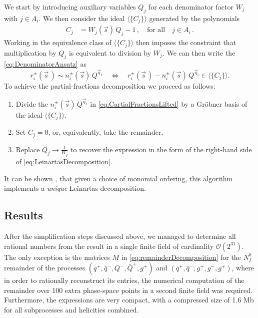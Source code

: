 We start by introducing auxiliary variables $Q_j$ for each
denominator factor $W_j$ with $j\in A_{i}$.
We then consider the ideal $\langle \{C_j\} \rangle $ generated by the polynomials
\begin{align} \label{eq:PartialFractionConstraints}
    C_j &= W_j (\vec s) \, Q_j - 1\,, \quad\mbox{for all}\quad  j \in  A_{i}\,.
\end{align}
Working in the equivalence class of $\langle \{C_j\} \rangle $ then imposes 
the constraint that multiplication by $Q_j$ is equivalent to division by $W_j$. 
We can then write the \cref{eq:DenominatorAnsatz} as
\begin{equation} \label{eq:CartialFractionsLifted}
    r_i^{\pm}(\vec{s}\,) \sim n_i^{\pm}(\vec s)\, Q^{\vec q_{i}} \quad\Leftrightarrow\quad r_i^{\pm}(\vec{s}\,) -  n_i^{\pm}(\vec s)\, Q^{\vec q_{i}} \in \langle \{C_j\} \rangle.
\end{equation}
To achieve the partial-fractions decomposition  we proceed as follows:
\begin{enumerate}
  \item Divide the $n_i^{\pm}(\vec s)\, Q^{\vec q_{i}}$ in \cref{eq:CartialFractionsLifted} by a Gröbner basis of the ideal $\langle \{C_j\} \rangle $.
  \item Set $C_j=0$, or, equivalently, take the remainder.
  \item Replace $Q_j\to \frac{1}{W_j}$ to recover the expression in the form of the right-hand side of \cref{eq:LeinartasDecomposition}.
\end{enumerate}
It can be shown \cite{raichev2012leinartas,Abreu:2019odu}, that given a choice of monomial ordering, this algorithm
implements a \emph{unique} Leǐnartas decomposition.

\subsection{Results}

After the simplification steps discussed above, 
we managed to determine all rational numbers from 
the result in a single finite field of cardinality $\mathcal{O}(2^{31})$.
The only exception is the matrices $M$ in \cref{eq:remainderDecomposition} for the $N_f^0$ remainder of the processes
$( q^+, {\bar q}^-,Q^-, {\bar Q}^+, g^+ )$ and $( q^+, {\bar q}^-,g^+, g^-, g^+ )$,  where
in order to rationally reconstruct its
entries, the numerical computation of the remainder over 100 extra phase-space 
points in a second finite field was required.
Furthermore, the expressions are very compact, with a compressed size of 1.6 Mb for
all subprocesses and helicities combined.

